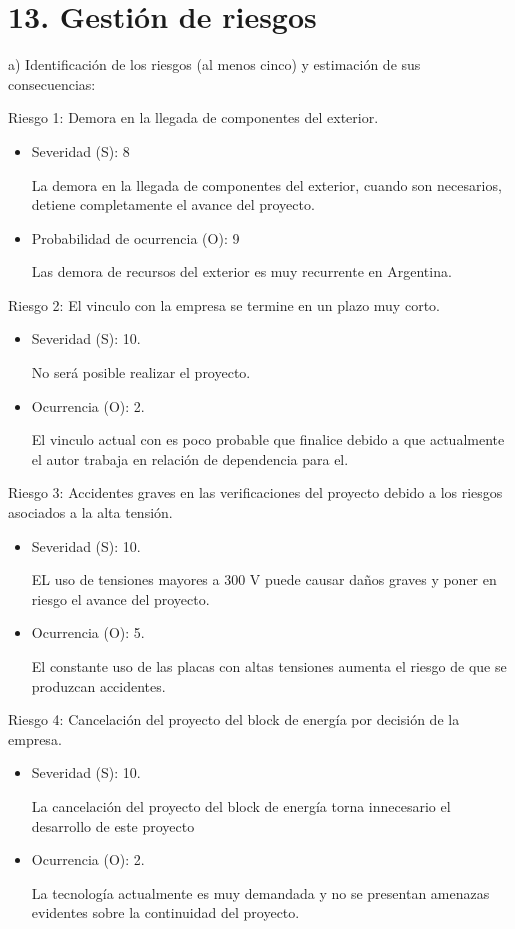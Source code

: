 \documentclass[
11pt, %
codirector, %
]{charter}
\begin{document}
\section{13. Gestión de riesgos}
\label{sec:riesgos}

	a) Identificación de los riesgos (al menos cinco) y estimación de sus consecuencias:

	Riesgo 1: Demora en la llegada de componentes del exterior.
	\begin{itemize}
		\item Severidad (S): 8

		      La demora en la llegada de componentes del exterior, cuando son necesarios, detiene completamente el avance del proyecto.
		\item Probabilidad de ocurrencia (O): 9

		      Las demora de recursos del exterior es muy recurrente en Argentina.
	\end{itemize}

	Riesgo 2: El vinculo con la empresa se termine en un plazo muy corto.
	\begin{itemize}
		\item Severidad (S): 10.

		      No será posible realizar el proyecto.
		\item Ocurrencia (O): 2.

		      El vinculo actual con \clientename\hspace{1px}  es poco probable que finalice debido a que actualmente el autor trabaja en relación de dependencia para el.
	\end{itemize}

	Riesgo 3: Accidentes graves en las verificaciones del proyecto debido a los riesgos asociados a la alta tensión.
	\begin{itemize}
		\item Severidad (S): 10.

		      EL uso de tensiones mayores a 300 V puede causar daños graves y poner en riesgo el avance del proyecto.
		\item Ocurrencia (O): 5.

		      El constante uso de las placas con altas tensiones aumenta el riesgo de que se produzcan accidentes.
	\end{itemize}

	Riesgo 4: Cancelación del proyecto del block de energía por decisión de la empresa.
	\begin{itemize}
		\item Severidad (S): 10.

		      La cancelación del proyecto del block de energía torna innecesario el desarrollo de este proyecto
		\item Ocurrencia (O): 2.

		      La tecnología actualmente es muy demandada y no se presentan amenazas evidentes sobre la continuidad del proyecto.
	\end{itemize}
\end{document}
